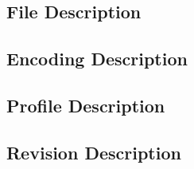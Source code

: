 


\subsection{File Description}


\subsection{Encoding Description}


\subsection{Profile Description}


\subsection{Revision Description}
